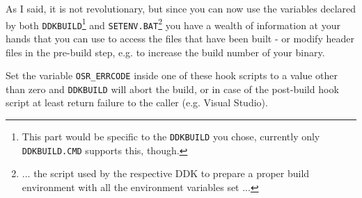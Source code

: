 \documentclass[a4paper,titlepage]{report}
\begin{document}
As I said, it is not revolutionary, but since you can now use the variables declared by both
\texttt{DDKBUILD}\footnote{This part would be specific to the \texttt{DDKBUILD} you chose,
currently only \texttt{DDKBUILD.CMD} supports this, though.} and \texttt{SETENV.BAT}\footnote{... the
script used by the respective DDK to prepare a proper build environment with all the
environment variables set ...} you have a wealth of information at your hands that
you can use to access the files that have been built - or modify header files in the
pre-build step, e.g. to increase the build number of your binary.

Set the variable \verb+OSR_ERRCODE+ inside one of these hook scripts to a value other than
zero and \texttt{DDKBUILD} will abort the build, or in case of the post-build hook script
at least return failure to the caller (e.g. Visual Studio).
\end{document}
